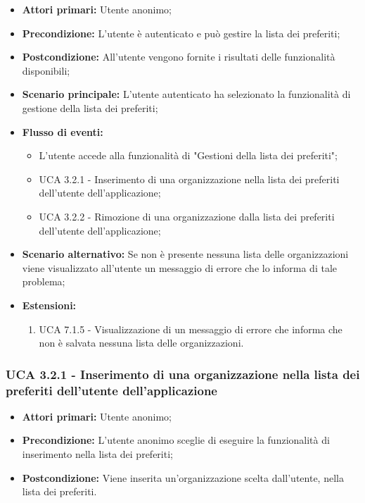 \begin{itemize}
	\item \textbf{Attori primari:} Utente anonimo;
	\item \textbf{Precondizione:} L'utente è autenticato e può gestire la lista dei preferiti;
	\item \textbf{Postcondizione:} All'utente vengono fornite i risultati delle funzionalità disponibili;
	\item \textbf{Scenario principale:} L'utente autenticato ha selezionato la funzionalità di gestione della lista dei preferiti;
	\item \textbf{Flusso di eventi:}
			\begin{itemize}
			\item L'utente accede alla funzionalità di "Gestioni della lista dei preferiti";
			\item UCA 3.2.1 - Inserimento di una organizzazione nella lista dei preferiti dell'utente dell'applicazione;
			\item UCA 3.2.2 - Rimozione di una organizzazione dalla lista dei preferiti dell'utente dell'applicazione;
			\end{itemize}
	\item \textbf{Scenario alternativo:} Se non è presente nessuna lista delle organizzazioni viene visualizzato all'utente un messaggio di errore che lo informa di tale problema;
	\item \textbf{Estensioni:}
	\begin{enumerate}
		\item UCA 7.1.5 - Visualizzazione di un messaggio di errore che informa che non è salvata nessuna lista delle organizzazioni.
	\end{enumerate}
\end{itemize}

\subsubsection{UCA 3.2.1 - Inserimento di una organizzazione nella lista dei preferiti dell'utente dell'applicazione}%
\begin{itemize}
	\item \textbf{Attori primari:} Utente anonimo;
	\item \textbf{Precondizione:} L'utente anonimo sceglie di eseguire la funzionalità di inserimento nella lista dei preferiti; 
	\item \textbf{Postcondizione:} Viene inserita un'organizzazione scelta dall'utente, nella lista dei preferiti.
\end{itemize}

